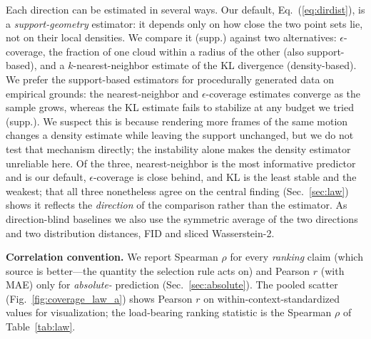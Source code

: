 Each direction can be estimated in several ways. Our default,
Eq.~(\ref{eq:dirdist}), is a \emph{support-geometry} estimator: it depends only
on how close the two point sets lie, not on their local densities. We compare it
(supp.) against two alternatives: $\epsilon$-coverage, the fraction of one cloud
within a radius of the other (also support-based), and a $k$-nearest-neighbor
estimate of the KL divergence (density-based). We prefer the support-based
estimators for procedurally generated data on empirical grounds: the
nearest-neighbor and $\epsilon$-coverage estimates converge as the sample grows,
whereas the KL estimate fails to stabilize at any budget we tried (supp.). We
suspect this is because rendering more frames of the same motion changes a
density estimate while leaving the support unchanged, but we do not test that
mechanism directly; the instability alone makes the density estimator unreliable
here. Of the three, nearest-neighbor is the most informative predictor and is our
default, $\epsilon$-coverage is close behind, and KL is the least stable and the
weakest; that all three nonetheless agree on the central finding
(Sec.~\ref{sec:law}) shows it reflects the \emph{direction} of the comparison
rather than the estimator. As direction-blind baselines we also use the symmetric
average of the two directions and two distribution distances, FID
\cite{heusel2018ganstrainedtimescaleupdate} and sliced Wasserstein-2.

\noindent\textbf{Correlation convention.} We report Spearman $\rho$ for every
\emph{ranking} claim (which source is better---the quantity the selection rule
acts on) and Pearson $r$ (with MAE) only for \emph{absolute-\pck} prediction
(Sec.~\ref{sec:absolute}). The pooled scatter (Fig.~\ref{fig:coverage_law_a}) shows
Pearson $r$ on within-context-standardized values for visualization; the
load-bearing ranking statistic is the Spearman $\rho$ of Table~\ref{tab:law}.

